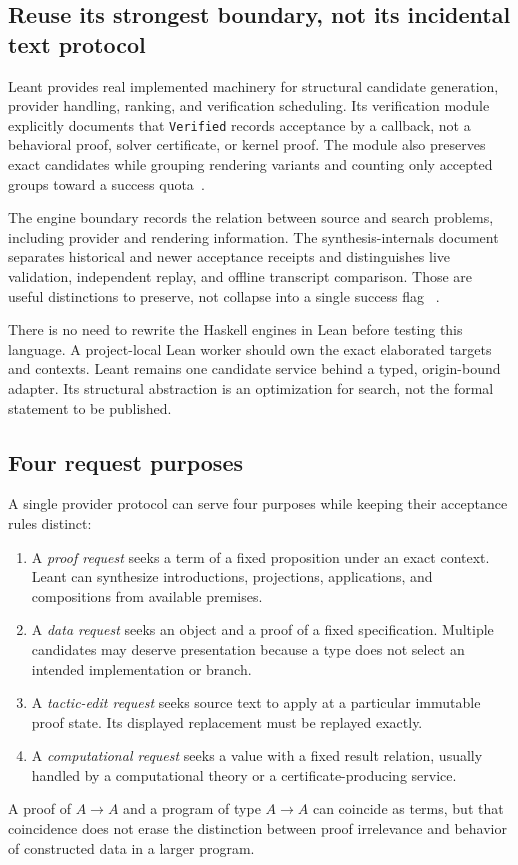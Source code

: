 \documentclass[11pt,letterpaper]{article}
\newcommand{\code}[1]{\nolinkurl{#1}}
\theoremstyle{definition}
\theoremstyle{remark}
\begin{document}
\subsection{Reuse its strongest boundary, not its incidental text protocol}
Leant provides real implemented machinery for structural candidate generation,
provider handling, ranking, and verification scheduling. Its verification
module explicitly documents that \code{Verified} records acceptance by a
callback, not a behavioral proof, solver certificate, or kernel proof. The
module also preserves exact candidates while grouping rendering variants and
counting only accepted groups toward a success quota~\cite{l-verify}.

The engine boundary records the relation between source and search problems,
including provider and rendering information. The synthesis-internals document
separates historical and newer acceptance receipts and distinguishes live
validation, independent replay, and offline transcript comparison. Those are
useful distinctions to preserve, not collapse into a single success flag
~\cite{leant-engine,l-internals}.

There is no need to rewrite the Haskell engines in Lean before testing this
language. A project-local Lean worker should own the exact elaborated targets
and contexts. Leant remains one candidate service behind a typed, origin-bound
adapter. Its structural abstraction is an optimization for search, not the
formal statement to be published.

\subsection{Four request purposes}
A single provider protocol can serve four purposes while keeping their
acceptance rules distinct:
\begin{enumerate}
\item A \emph{proof request} seeks a term of a fixed proposition under an exact
context. Leant can synthesize introductions, projections, applications, and
compositions from available premises.
\item A \emph{data request} seeks an object and a proof of a fixed specification.
Multiple candidates may deserve presentation because a type does not select
an intended implementation or branch.
\item A \emph{tactic-edit request} seeks source text to apply at a particular
immutable proof state. Its displayed replacement must be replayed exactly.
\item A \emph{computational request} seeks a value with a fixed result relation,
usually handled by a computational theory or a certificate-producing service.
\end{enumerate}
A proof of $A\to A$ and a program of type $A\to A$ can coincide as terms, but
that coincidence does not erase the distinction between proof irrelevance
and behavior of constructed data in a larger program.
\end{document}
